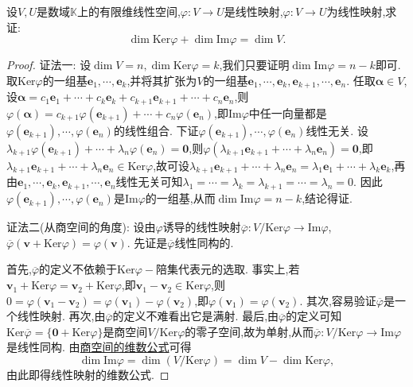 \documentclass[../../main.tex]{subfiles}%
\begin{document}
\begin{theorem}[线性映射维数公式]\label{theorem:线性映射的维数公式}
设\(V,U\)是数域\(\mathbb{K}\)上的有限维线性空间,\(\varphi:V\to U\)是线性映射,\(\varphi:V\to U\)为线性映射,求证:\[
\dim\text{Ker}\varphi+\dim\text{Im}\varphi=\dim V.
\]
\end{theorem}
\begin{proof}

{\color{blue}证法一:}
设\(\dim V = n,\dim\text{Ker}\varphi = k\),我们只要证明\(\dim\text{Im}\varphi=n - k\)即可. 取\(\text{Ker}\varphi\)的一组基\(\boldsymbol{e}_1,\cdots,\boldsymbol{e}_k\),并将其扩张为\(V\)的一组基\(\boldsymbol{e}_1,\cdots,\boldsymbol{e}_k,\boldsymbol{e}_{k + 1},\cdots,\boldsymbol{e}_n\). 任取\(\boldsymbol{\alpha}\in V\),设\(\boldsymbol{\alpha}=c_1\boldsymbol{e}_1+\cdots + c_k\boldsymbol{e}_k + c_{k + 1}\boldsymbol{e}_{k + 1}+\cdots + c_n\boldsymbol{e}_n\),则\(\varphi(\boldsymbol{\alpha})=c_{k + 1}\varphi(\boldsymbol{e}_{k + 1})+\cdots + c_n\varphi(\boldsymbol{e}_n)\),即\(\text{Im}\varphi\)中任一向量都是\(\varphi(\boldsymbol{e}_{k + 1}),\cdots,\varphi(\boldsymbol{e}_n)\)的线性组合. 下证\(\varphi(\boldsymbol{e}_{k + 1}),\cdots,\varphi(\boldsymbol{e}_n)\)线性无关. 设\(\lambda_{k + 1}\varphi(\boldsymbol{e}_{k + 1})+\cdots + \lambda_n\varphi(\boldsymbol{e}_n)=\boldsymbol{0}\),则\(\varphi(\lambda_{k + 1}\boldsymbol{e}_{k + 1}+\cdots + \lambda_n\boldsymbol{e}_n)=\boldsymbol{0}\),即\(\lambda_{k + 1}\boldsymbol{e}_{k + 1}+\cdots + \lambda_n\boldsymbol{e}_n\in\text{Ker}\varphi\),故可设\(\lambda_{k + 1}\boldsymbol{e}_{k + 1}+\cdots + \lambda_n\boldsymbol{e}_n=\lambda_1\boldsymbol{e}_1+\cdots + \lambda_k\boldsymbol{e}_k\),再由\(\boldsymbol{e}_1,\cdots,\boldsymbol{e}_k,\boldsymbol{e}_{k + 1},\cdots,\boldsymbol{e}_n\)线性无关可知\(\lambda_1=\cdots=\lambda_k=\lambda_{k + 1}=\cdots=\lambda_n = 0\). 因此\(\varphi(\boldsymbol{e}_{k + 1}),\cdots,\varphi(\boldsymbol{e}_n)\)是\(\text{Im}\varphi\)的一组基,从而\(\dim\text{Im}\varphi=n - k\),结论得证. 

{\color{blue}证法二(从商空间的角度):}
设由\(\varphi\)诱导的线性映射\(\overline{\varphi}:V/\text{Ker}\varphi\to\text{Im}\varphi\),\(\overline{\varphi}(\boldsymbol{v}+\text{Ker}\varphi)=\varphi(\boldsymbol{v})\). 先证是$\overline{\varphi}$线性同构的.

首先,\(\overline{\varphi}\)的定义不依赖于\(\text{Ker}\varphi -\)陪集代表元的选取. 事实上,若\(\boldsymbol{v}_1+\text{Ker}\varphi=\boldsymbol{v}_2+\text{Ker}\varphi\),即\(\boldsymbol{v}_1 - \boldsymbol{v}_2\in\text{Ker}\varphi\),则\(0=\varphi(\boldsymbol{v}_1 - \boldsymbol{v}_2)=\varphi(\boldsymbol{v}_1)-\varphi(\boldsymbol{v}_2)\),即\(\varphi(\boldsymbol{v}_1)=\varphi(\boldsymbol{v}_2)\). 其次,容易验证\(\overline{\varphi}\)是一个线性映射. 再次,由\(\overline{\varphi}\)的定义不难看出它是满射. 最后,由\(\overline{\varphi}\)的定义可知\(\text{Ker}\overline{\varphi}=\{\boldsymbol{0}+\text{Ker}\varphi\}\)是商空间\(V/\text{Ker}\varphi\)的零子空间,故为单射,从而\(\overline{\varphi}:V/\text{Ker}\varphi\to\text{Im}\varphi\)是线性同构. 由\hyperref[proposition:商空间的维数公式和商空间与补空间同构]{商空间的维数公式}可得
\[
\dim\text{Im}\varphi=\dim(V/\text{Ker}\varphi)=\dim V-\dim\text{Ker}\varphi,
\]
由此即得线性映射的维数公式.
\end{proof}
\end{document}
